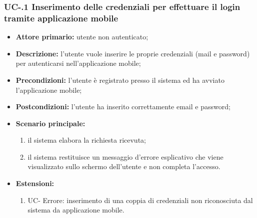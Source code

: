 \subsubsection{UC-.1 Inserimento delle credenziali per effettuare il login tramite applicazione mobile}
\begin{itemize}
	\item \textbf{Attore primario:} utente non autenticato;

	\item \textbf{Descrizione:} l'utente vuole inserire le proprie credenziali (mail e password) per autenticarsi nell'applicazione mobile;

	\item \textbf{Precondizioni:} l'utente è registrato presso il sistema ed ha avviato l'applicazione mobile;

	\item \textbf{Postcondizioni:} l'utente ha inserito correttamente email e password;

	\item \textbf{Scenario principale:}
	      \begin{enumerate}
		      \item il sistema elabora la richiesta ricevuta;
		      \item il sistema restituisce un messaggio d'errore esplicativo che viene visualizzato sullo schermo dell'utente e non completa l'accesso.
	      \end{enumerate}
	\item \textbf{Estensioni:}
		\begin{enumerate}
		      \item UC- Errore: inserimento di una coppia di credenziali non riconosciuta dal sistema da applicazione mobile.
	      \end{enumerate}
\end{itemize}

